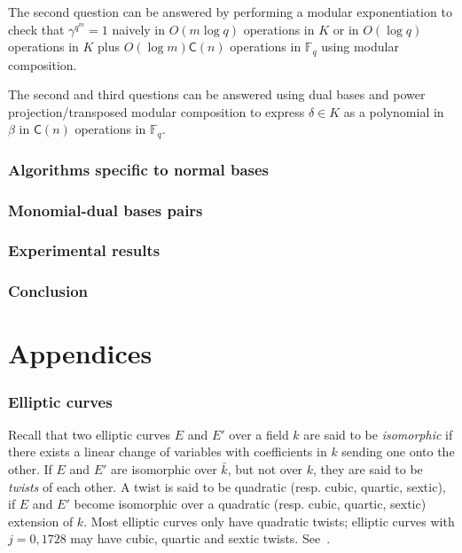 \documentclass[12pt]{article}
\theoremstyle{plain}
\theoremstyle{definition}
\def\F{\ensuremath{\mathbb{F}}}
\def\MC{\ensuremath{\mathsf{C}}}
\begin{document}
The second question can be answered by performing a modular
exponentiation to check that $\gamma^{q^{m}} = 1$
naively in $O(m \log q)$ operations in $K$
or in $O(\log q)$ operations in $K$ plus
$O(\log m) \MC(n)$ operations in $\F_q$ using modular composition.

The second and third questions can be answered using
dual bases and power projection/transposed modular composition
to express $\delta \in K$ as a polynomial in $\beta$ in
$\MC(n)$ operations in $\F_q$.



\section{Algorithms specific to normal bases}


\section{Monomial-dual bases pairs}


\section{Experimental results}


\section{Conclusion}


\appendix
\part*{Appendices}


\section{Elliptic curves}
\label{app:elliptic-curves}

Recall that two elliptic curves $E$ and $E'$ over a field $k$ are said
to be \emph{isomorphic} if there exists a linear change of variables
with coefficients in $k$ sending one onto the other. If $E$ and $E'$
are isomorphic over $\bar{k}$, but not over $k$, they are said to be
\emph{twists} of each other. A twist is said to be quadratic
(resp. cubic, quartic, sextic), if $E$ and $E'$ become isomorphic over
a quadratic (resp. cubic, quartic, sextic) extension of $k$. Most
elliptic curves only have quadratic twists; elliptic curves with
$j=0,1728$ may have cubic, quartic and sextic twists. See~\cite{Sil}.
\end{document}
